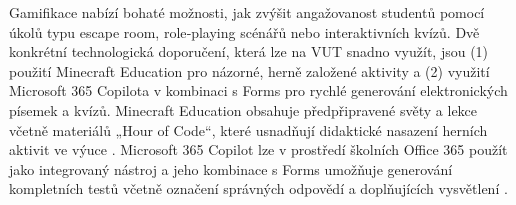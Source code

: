 Gamifikace nabízí bohaté možnosti, jak zvýšit angažovanost studentů pomocí úkolů typu escape room, role‑playing scénářů nebo interaktivních kvízů. Dvě konkrétní technologická doporučení, která lze na VUT snadno využít, jsou (1) použití Minecraft Education pro názorné, herně založené aktivity a (2) využití Microsoft 365 Copilota v kombinaci s Forms pro rychlé generování elektronických písemek a kvízů. Minecraft Education obsahuje předpřipravené světy a lekce včetně materiálů „Hour of Code“, které usnadňují didaktické nasazení herních aktivit ve výuce \cite{kb_ai_101_tipu_pdf_04e4a115_page_15_2}. Microsoft 365 Copilot lze v prostředí školních Office 365 použít jako integrovaný nástroj a jeho kombinace s Forms umožňuje generování kompletních testů včetně označení správných odpovědí a doplňujících vysvětlení \cite{kb_ai_101_tipu_pdf_04e4a115_page_3_1, kb_ai_101_tipu_pdf_04e4a115_page_36_1}.


